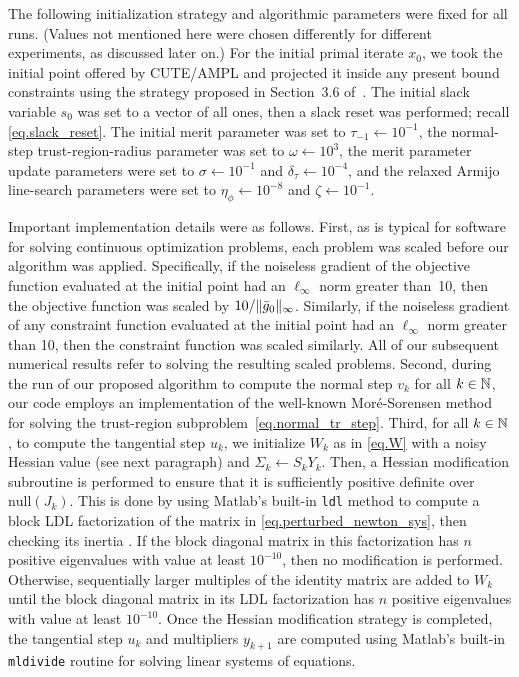 The following initialization strategy and algorithmic parameters were fixed for all runs.  (Values not mentioned here were chosen differently for different experiments, as discussed later on.)  For the initial primal iterate $x_0$, we took the initial point offered by CUTE/AMPL and projected it inside any present bound constraints using the strategy proposed in Section~3.6 of~\cite{wachter2006implementation}.  The initial slack variable $s_0$ was set to a vector of all ones, then a slack reset was performed; recall \eqref{eq.slack_reset}. The initial merit parameter was set to $\tau_{-1} \gets 10^{-1}$, the normal-step trust-region-radius parameter was set to $\omega \gets 10^3$, the merit parameter update parameters were set to $\sigma \gets 10^{-1}$ and $\delta_{\tau} \gets 10^{-4}$, and the relaxed Armijo line-search parameters were set to $\eta_{\phi} \gets 10^{-8}$ and $\zeta \gets 10^{-1}$.

Important implementation details were as follows.  First, as is typical for software for solving continuous optimization problems, each problem was scaled before our algorithm was applied.  Specifically, if the noiseless gradient of the objective function evaluated at the initial point had an $\ell_\infty$ norm greater than~10, then the objective function was scaled by $10/\|{\bar g}_0\|_\infty$.  Similarly, if the noiseless gradient of any constraint function evaluated at the initial point had an $\ell_\infty$ norm greater than 10, then the constraint function was scaled similarly.  All of our subsequent numerical results refer to solving the resulting scaled problems.  Second, during the run of our proposed algorithm to compute the normal step $v_k$ for all $k \in \mathbb{N}$, our code employs an implementation of the well-known Mor\'e-Sorensen method~\cite{more1983computing} for solving the trust-region subproblem~\eqref{eq.normal_tr_step}.  Third, for all $k \in \mathbb{N}$, to compute the tangential step $u_k$, we initialize $W_k$ as in \eqref{eq.W} with a noisy Hessian value (see next paragraph) and $\Sigma_k \gets S_kY_k$.  Then, a Hessian modification subroutine is performed to ensure that it is sufficiently positive definite over $\mathrm{null}(J_k)$.  This is done by using Matlab's built-in \texttt{ldl} method to compute a block LDL factorization of the matrix in \eqref{eq.perturbed_newton_sys}, then checking its inertia \cite{nocedal1999numerical}.  If the block diagonal matrix in this factorization has $n$ positive eigenvalues with value at least $10^{-10}$, then no modification is performed.  Otherwise, sequentially larger multiples of the identity matrix are added to $W_k$ until the block diagonal matrix in its LDL factorization has $n$ positive eigenvalues with value at least $10^{-10}$.  Once the Hessian modification strategy is completed, the tangential step $u_k$ and multipliers $y_{k+1}$ are computed using Matlab's built-in \texttt{mldivide} routine for solving linear systems of equations.


